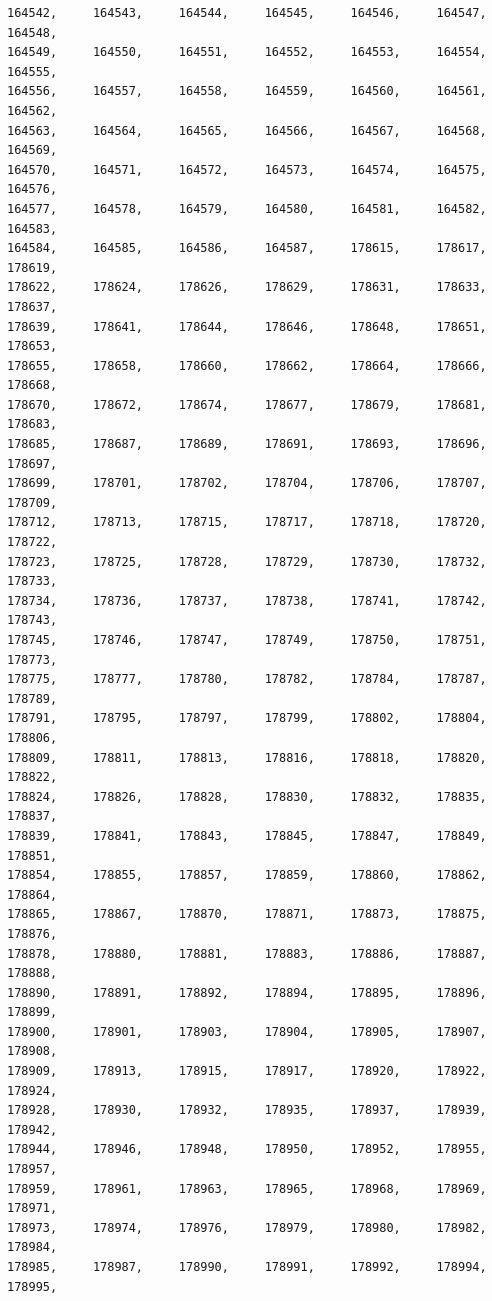 \documentclass[a4paper,11pt]{report}
\begin{document}
\begin{verbatim}
164542,     164543,     164544,     164545,     164546,     164547,     164548,
164549,     164550,     164551,     164552,     164553,     164554,     164555,
164556,     164557,     164558,     164559,     164560,     164561,     164562,
164563,     164564,     164565,     164566,     164567,     164568,     164569,
164570,     164571,     164572,     164573,     164574,     164575,     164576,
164577,     164578,     164579,     164580,     164581,     164582,     164583,
164584,     164585,     164586,     164587,     178615,     178617,     178619,
178622,     178624,     178626,     178629,     178631,     178633,     178637,
178639,     178641,     178644,     178646,     178648,     178651,     178653,
178655,     178658,     178660,     178662,     178664,     178666,     178668,
178670,     178672,     178674,     178677,     178679,     178681,     178683,
178685,     178687,     178689,     178691,     178693,     178696,     178697,
178699,     178701,     178702,     178704,     178706,     178707,     178709,
178712,     178713,     178715,     178717,     178718,     178720,     178722,
178723,     178725,     178728,     178729,     178730,     178732,     178733,
178734,     178736,     178737,     178738,     178741,     178742,     178743,
178745,     178746,     178747,     178749,     178750,     178751,     178773,
178775,     178777,     178780,     178782,     178784,     178787,     178789,
178791,     178795,     178797,     178799,     178802,     178804,     178806,
178809,     178811,     178813,     178816,     178818,     178820,     178822,
178824,     178826,     178828,     178830,     178832,     178835,     178837,
178839,     178841,     178843,     178845,     178847,     178849,     178851,
178854,     178855,     178857,     178859,     178860,     178862,     178864,
178865,     178867,     178870,     178871,     178873,     178875,     178876,
178878,     178880,     178881,     178883,     178886,     178887,     178888,
178890,     178891,     178892,     178894,     178895,     178896,     178899,
178900,     178901,     178903,     178904,     178905,     178907,     178908,
178909,     178913,     178915,     178917,     178920,     178922,     178924,
178928,     178930,     178932,     178935,     178937,     178939,     178942,
178944,     178946,     178948,     178950,     178952,     178955,     178957,
178959,     178961,     178963,     178965,     178968,     178969,     178971,
178973,     178974,     178976,     178979,     178980,     178982,     178984,
178985,     178987,     178990,     178991,     178992,     178994,     178995,

\end{verbatim}
\end{document}
